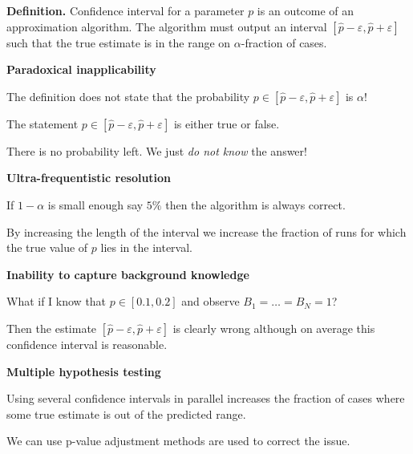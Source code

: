 \documentclass[landscape,footrule]{foils}
\begin{document}

\textbf{Definition.}
Confidence interval for a parameter $p$ is an outcome of an approximation algorithm. The algorithm  must output an interval $[\hat{p}-\varepsilon,\hat{p}+\varepsilon]$ such that the true estimate is in the range on $\alpha$-fraction of cases.
\vspace*{2ex}

\textbf{Paradoxical inapplicability}

The definition does not state that the probability $p\in[\hat{p}-\varepsilon,\hat{p}+\varepsilon]$ is $\alpha$!
\begin{triangles}
\item The statement $p\in[\hat{p}-\varepsilon,\hat{p}+\varepsilon]$ is either true or false.
\item There is no probability left. We just \emph{do not know} the answer!
\end{triangles} 
\vspace*{3ex}

\textbf{Ultra-frequentistic resolution}
\begin{triangles}
\item  If $1-\alpha$ is small enough say $5\%$ then the algorithm is always correct. 
\end{triangles}




By increasing the length of the interval we increase the fraction of runs for which the true value of $p$ lies in the interval.



\textbf{Inability to capture background knowledge}
\begin{triangles}
\item What if I know that $p\in[0.1,0.2]$ and observe $B_1=\ldots=B_N=1$?
\item Then the estimate $[\hat{p}-\varepsilon,\hat{p}+\varepsilon]$  is clearly wrong although on average this confidence interval is reasonable.
\end{triangles}
\vspace*{2cm}


\textbf{Multiple hypothesis testing}

\begin{triangles}
\item Using several confidence intervals in parallel increases the fraction of cases where some true estimate is out of the predicted range.
\item We can use p-value adjustment methods are used to correct the issue.
\end{triangles}  
\end{document}
